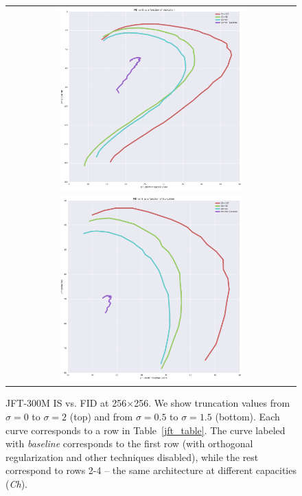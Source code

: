 \begin{figure}[htbp]
\centering
\begin{tabular}{c}
\includegraphics[width=0.65\textwidth]{images/jft_truncation_curves/jft_truncation_curve_256.pdf} \\
\includegraphics[width=0.65\textwidth]{images/jft_truncation_curves/jft_truncation_curve_256_0p5_1p5.pdf}
\end{tabular}
\caption{
JFT-300M IS vs. FID at 256$\times$256.
We show truncation values from $\sigma = 0$ to $\sigma = 2$ (top) 
and from $\sigma = 0.5$ to $\sigma = 1.5$ (bottom).
Each curve corresponds to a row in Table~\ref{jft_table}.
The curve labeled with \textit{baseline} corresponds to the first row (with orthogonal regularization and other techniques disabled), while the rest correspond to rows 2-4 -- the same architecture at different capacities (\textit{Ch}). 
\label{appendix_jft_trunc}
}
\end{figure}